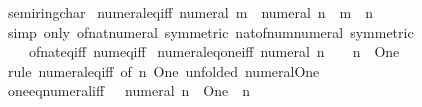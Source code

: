 \begin{isabellebody}
%
\isadelimdocument
%
\endisadelimdocument
%
\isatagdocument
%
\isamarkuptrue%
%
\endisatagdocument
{\isafolddocument}%
%
\isadelimdocument
%
\endisadelimdocument
{}\isamarkupfalse%
\ semiring{\isacharunderscore}{\kern0pt}char{\isacharunderscore}{\kern0pt}{}\isanewline
{}\isanewline
\isanewline
{}\isamarkupfalse%
\ numeral{\isacharunderscore}{\kern0pt}eq{\isacharunderscore}{\kern0pt}iff{\isacharcolon}{\kern0pt}\ {\isachardoublequoteopen}numeral\ m\ {\isacharequal}{\kern0pt}\ numeral\ n\ {\isasymlongleftrightarrow}\ m\ {\isacharequal}{\kern0pt}\ n{\isachardoublequoteclose}\isanewline
%
\isadelimproof
\ \ %
\endisadelimproof
%
\isatagproof
{}\isamarkupfalse%
\ {\isacharparenleft}{\kern0pt}simp\ only{\isacharcolon}{\kern0pt}\ of{\isacharunderscore}{\kern0pt}nat{\isacharunderscore}{\kern0pt}numeral\ {\isacharbrackleft}{\kern0pt}symmetric{\isacharbrackright}{\kern0pt}\ nat{\isacharunderscore}{\kern0pt}of{\isacharunderscore}{\kern0pt}num{\isacharunderscore}{\kern0pt}numeral\ {\isacharbrackleft}{\kern0pt}symmetric{\isacharbrackright}{\kern0pt}\isanewline
\ \ \ \ of{\isacharunderscore}{\kern0pt}nat{\isacharunderscore}{\kern0pt}eq{\isacharunderscore}{\kern0pt}iff\ num{\isacharunderscore}{\kern0pt}eq{\isacharunderscore}{\kern0pt}iff{\isacharparenright}{\kern0pt}%
\endisatagproof
{\isafoldproof}%
%
\isadelimproof
\isanewline
%
\endisadelimproof
\isanewline
{}\isamarkupfalse%
\ numeral{\isacharunderscore}{\kern0pt}eq{\isacharunderscore}{\kern0pt}one{\isacharunderscore}{\kern0pt}iff{\isacharcolon}{\kern0pt}\ {\isachardoublequoteopen}numeral\ n\ {\isacharequal}{\kern0pt}\ {}\ {\isasymlongleftrightarrow}\ n\ {\isacharequal}{\kern0pt}\ One{\isachardoublequoteclose}\isanewline
%
\isadelimproof
\ \ %
\endisadelimproof
%
\isatagproof
{}\isamarkupfalse%
\ {\isacharparenleft}{\kern0pt}rule\ numeral{\isacharunderscore}{\kern0pt}eq{\isacharunderscore}{\kern0pt}iff\ {\isacharbrackleft}{\kern0pt}of\ n\ One{\isacharcomma}{\kern0pt}\ unfolded\ numeral{\isacharunderscore}{\kern0pt}One{\isacharbrackright}{\kern0pt}{\isacharparenright}{\kern0pt}%
\endisatagproof
{\isafoldproof}%
%
\isadelimproof
\isanewline
%
\endisadelimproof
\isanewline
{}\isamarkupfalse%
\ one{\isacharunderscore}{\kern0pt}eq{\isacharunderscore}{\kern0pt}numeral{\isacharunderscore}{\kern0pt}iff{\isacharcolon}{\kern0pt}\ {\isachardoublequoteopen}{}\ {\isacharequal}{\kern0pt}\ numeral\ n\ {\isasymlongleftrightarrow}\ One\ {\isacharequal}{\kern0pt}\ n{\isachardoublequoteclose}\isanewline

\end{isabellebody}
